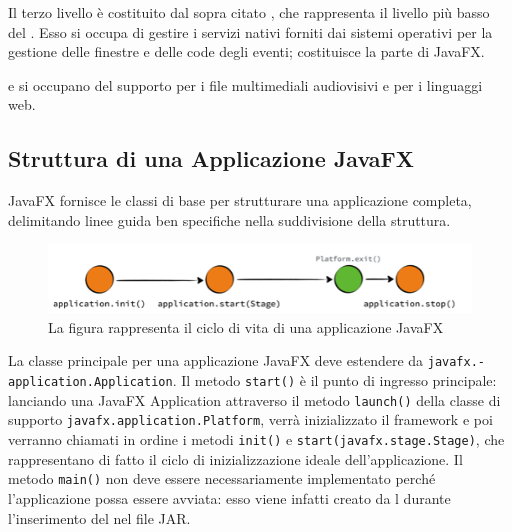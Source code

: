             Il terzo livello è costituito dal sopra citato , che rappresenta il livello più basso del .
            Esso si occupa di gestire i servizi nativi forniti dai sistemi operativi per la gestione delle finestre e delle code degli eventi; costituisce la parte  di JavaFX.

             e  si occupano del supporto per i file multimediali audiovisivi e per i linguaggi web.

        \subsection{Struttura di una Applicazione JavaFX}\label{sub:jfxStruttura}

            JavaFX fornisce le classi di base per strutturare una applicazione completa, delimitando linee guida ben specifiche nella suddivisione della struttura.

            \begin{figure}[htbp]
                \centering
                \includegraphics[scale=1]{img/jfxLifecycle}
                \caption{La figura rappresenta il ciclo di vita di una applicazione JavaFX}
                \label{fig:jfxLife}
            \end{figure}

            La classe principale per una applicazione JavaFX deve estendere da \texttt{javafx\dothyp application\dothyp Application}. Il metodo \texttt{start()} è il punto di ingresso principale: lanciando una JavaFX Application attraverso il metodo \texttt{launch()} della classe di supporto \texttt{javafx\dothyp application\dothyp Platform}, verrà inizializzato il framework e poi verranno chiamati in ordine i metodi \texttt{init()} e \texttt{start(javafx\dothyp stage\dothyp Stage)}, che rappresentano di fatto il ciclo di inizializzazione ideale dell'applicazione.
            Il metodo \texttt{main()} non deve essere necessariamente implementato perché l'applicazione possa essere avviata: esso viene infatti creato da l durante l'inserimento del  nel file JAR.

